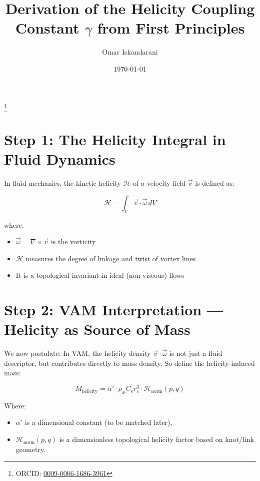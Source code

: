 \documentclass[a4paper, aps,preprint,superscriptaddress, 12pt]{revtex4}
\begin{document}
    \author{Omar Iskandarani}
    \title{Derivation of the Helicity Coupling Constant \( \gamma \) from First Principles}
    \date{\today}
    \thanks{ORCID: \href{https://orcid.org/0009-0006-1686-3961}{0009-0006-1686-3961}}



\section*{Step 1: The Helicity Integral in Fluid Dynamics}

In fluid mechanics, the kinetic helicity $\mathcal{H}$ of a velocity field ⃗$\vec{v}$ is defined as:


\[\boxed{
    \mathcal{H} = \int_V \vec{v} \cdot \vec{\omega} \, dV
}
\tag{1}\]


where:


\begin{itemize}

\item $\vec{\omega} = \nabla \times \vec{v}$  is the vorticity
\item $\mathcal{H}$ measures the degree of linkage and twist of vortex lines
\item It is a topological invariant in ideal (non-viscous) flows

\end{itemize}



\section*{Step 2: VAM Interpretation — Helicity as Source of Mass}

We now postulate:
In VAM, the helicity density $\vec{v} \cdot \vec{\omega}$ is not just a fluid descriptor, but contributes directly to mass density.
So define the helicity-induced mass:

\[ M_{\text{helicity}} = \alpha' \cdot \rho_\text{\ae} C_e r_c^3 \cdot \mathcal{H}_{\text{norm}}(p,q)
\tag{2} \]


Where:


\begin{itemize}
\item $\alpha'$ is a dimensional constant (to be matched later),
\item $\mathcal{H}_{\text{norm}}(p,q)$ is a dimensionless topological helicity factor based on knot/link geometry.
\end{itemize}
\end{document}
